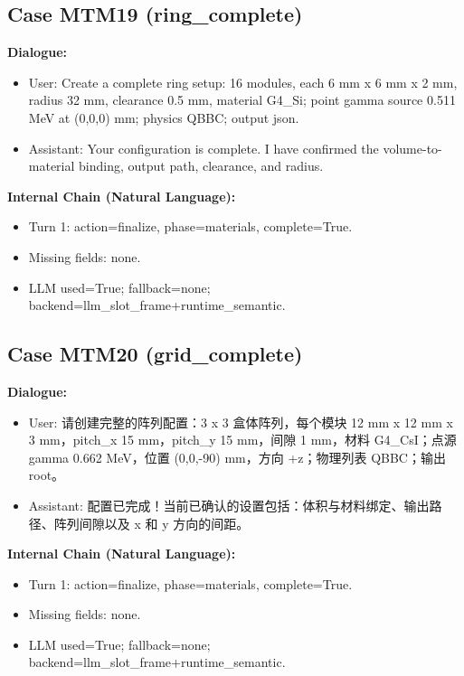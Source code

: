 \documentclass[11pt]{ctexart}
\begin{document}
\subsection{Case MTM19 (ring\_complete)}
\textbf{Dialogue:}
\begin{itemize}
\item User: Create a complete ring setup: 16 modules, each 6 mm x 6 mm x 2 mm, radius 32 mm, clearance 0.5 mm, material G4\_Si; point gamma source 0.511 MeV at (0,0,0) mm; physics QBBC; output json.
\item Assistant: Your configuration is complete. I have confirmed the volume-to-material binding, output path, clearance, and radius.
\end{itemize}
\textbf{Internal Chain (Natural Language):}
\begin{itemize}
\item Turn 1: action=finalize, phase=materials, complete=True.
\item Missing fields: none.
\item LLM used=True; fallback=none; backend=llm\_slot\_frame+runtime\_semantic.
\end{itemize}
\subsection{Case MTM20 (grid\_complete)}
\textbf{Dialogue:}
\begin{itemize}
\item User: 请创建完整的阵列配置：3 x 3 盒体阵列，每个模块 12 mm x 12 mm x 3 mm，pitch\_x 15 mm，pitch\_y 15 mm，间隙 1 mm，材料 G4\_CsI；点源 gamma 0.662 MeV，位置 (0,0,-90) mm，方向 +z；物理列表 QBBC；输出 root。
\item Assistant: 配置已完成！当前已确认的设置包括：体积与材料绑定、输出路径、阵列间隙以及 x 和 y 方向的间距。
\end{itemize}
\textbf{Internal Chain (Natural Language):}
\begin{itemize}
\item Turn 1: action=finalize, phase=materials, complete=True.
\item Missing fields: none.
\item LLM used=True; fallback=none; backend=llm\_slot\_frame+runtime\_semantic.
\end{itemize}
\end{document}
